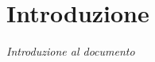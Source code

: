 \chapter*{Introduzione} \label{introduzione}

\vspace{2cm}

\hfill \textit{Introduzione al documento}

\vspace{0.5cm}

